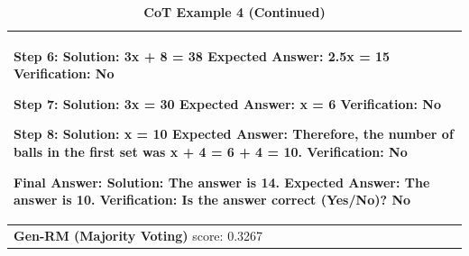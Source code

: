 \begin{table}[ht]
\begin{tabular}{ |p{16.4cm}| }
{Step 6:\newline
Solution: 3x + 8 = 38\newline
Expected Answer: 2.5x = 15\newline
Verification: No\newline

Step 7:\newline
Solution: 3x = 30\newline
Expected Answer: x = 6\newline
Verification: No\newline

Step 8:\newline
Solution: x = 10\newline
Expected Answer: Therefore, the number of balls in the first set was x + 4 = 6 + 4 = 10.\newline
Verification: No\newline

Final Answer:\newline
Solution: The answer is 14.\newline
Expected Answer: The answer is 10.\newline
Verification: {\color{blue}Is the answer correct (Yes/No)? No}\newline
} \\
\midrule
{\textbf{Gen-RM (Majority Voting)} score: {\color{blue}0.3267}}
\newline \\
\midrule
\end{tabular}
\caption{
\textbf{{\genV} CoT Example 4 (Continued)}}
\label{cot-verifier-example-3-full-text-continued}
\end{table}


